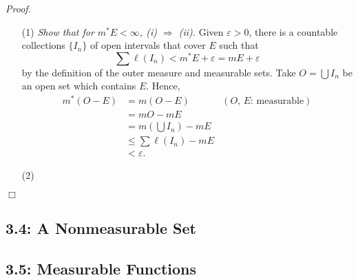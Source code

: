 \documentclass{article}
\begin{document}
\emph{Proof.}
\begin{enumerate}
\item[(1)]
  \emph{Show that for $m^{*}E < \infty$, (i) $\Rightarrow$ (ii).}
  Given $\varepsilon > 0$,
  there is a countable collections $\{ I_n \}$ of open intervals that cover $E$
  such that
  \[
    \sum \ell(I_n) < m^{*}E + \varepsilon = mE + \varepsilon
  \]
  by the definition of the outer measure and measurable sets.
  Take $O = \bigcup I_n$ be an open set which contains $E$.
  Hence,
  \begin{align*}
    m^{*}(O - E)
    &= m(O - E)
      &(\text{$O$, $E$: measurable}) \\
    &= mO - mE \\
    &= m\left( \bigcup I_n \right) - mE \\
    &\leq \sum \ell(I_n) - mE \\
    &< \varepsilon.
  \end{align*}

\item[(2)]

\end{enumerate}
$\Box$\\







\subsection*{3.4: A Nonmeasurable Set \\}






\subsection*{3.5: Measurable Functions \\}



\end{document}
